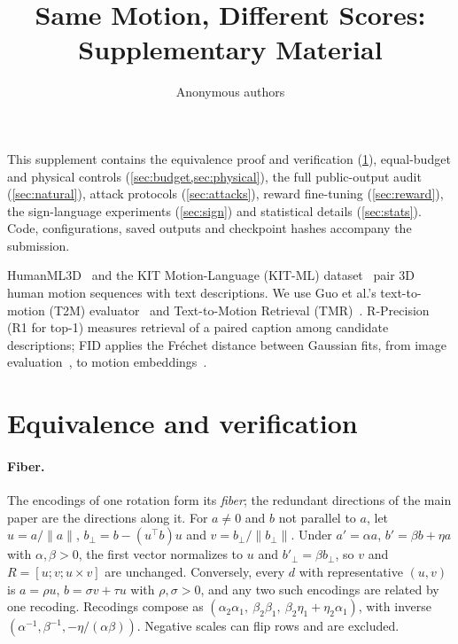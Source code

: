 \documentclass[10pt,twocolumn,letterpaper]{article}
\title{Same Motion, Different Scores:\\ Supplementary Material}
\author{Anonymous authors}
\begin{document}
\raggedbottom\maketitle
\setcounter{section}{0}
\renewcommand{\thetable}{S\arabic{table}}
\renewcommand{\thefigure}{S\arabic{figure}}

This supplement contains the equivalence proof and verification (\cref{sec:proof}), equal-budget and physical controls (\cref{sec:budget,sec:physical}), the full public-output audit (\cref{sec:natural}), attack protocols (\cref{sec:attacks}), reward fine-tuning (\cref{sec:reward}), the sign-language experiments (\cref{sec:sign}) and statistical details (\cref{sec:stats}). Code, configurations, saved outputs and checkpoint hashes accompany the submission.

HumanML3D~\cite{guo2022} and the KIT Motion-Language (KIT-ML) dataset~\cite{kit2016} pair 3D human motion sequences with text descriptions. We use Guo et al.'s text-to-motion (T2M) evaluator~\cite{guo2022} and Text-to-Motion Retrieval (TMR)~\cite{tmr2023}. R-Precision (R1 for top-1) measures retrieval of a paired caption among candidate descriptions; FID applies the Fr\'echet distance between Gaussian fits, from image evaluation~\cite{heusel2017}, to motion embeddings~\cite{guo2022}.

\section{Equivalence and verification}\label{sec:proof}
\paragraph{Fiber.} The encodings of one rotation form its \emph{fiber}; the redundant directions of the main paper are the directions along it. For $a\ne0$ and $b$ not parallel to $a$, let $u=a/\|a\|$, $b_\perp=b-(u^\top b)u$ and $v=b_\perp/\|b_\perp\|$. Under $a'=\alpha a$, $b'=\beta b+\eta a$ with $\alpha,\beta>0$, the first vector normalizes to $u$ and $b'_\perp=\beta b_\perp$, so $v$ and $R=[u;v;u\times v]$ are unchanged. Conversely, every $d$ with representative $(u,v)$ is $a=\rho u$, $b=\sigma v+\tau u$ with $\rho,\sigma>0$, and any two such encodings are related by one recoding. Recodings compose as $(\alpha_2\alpha_1,\ \beta_2\beta_1,\ \beta_2\eta_1+\eta_2\alpha_1)$, with inverse $(\alpha^{-1},\beta^{-1},-\eta/(\alpha\beta))$. Negative scales can flip rows and are excluded.
\end{document}
